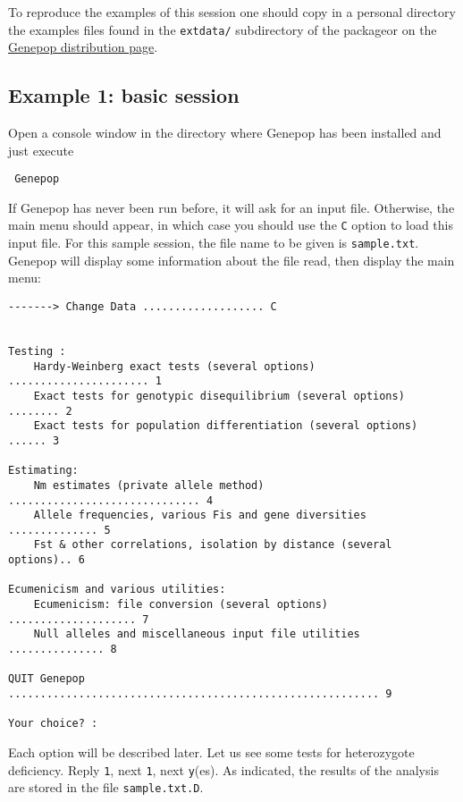 \documentclass[12pt,]{book}
\theoremstyle{definition}
\theoremstyle{definition}
\theoremstyle{definition}
\theoremstyle{remark}
\begin{document}
To reproduce the examples of this session one should copy in a personal
directory the examples files found in the \texttt{extdata/} subdirectory
of the packageor on the
\href{http://kimura.univ-montp2.fr/~rousset/Genepop.htm}{Genepop
distribution page}.

\subsection{Example 1: basic session}\label{example-1-basic-session}

Open a console window in the directory where Genepop has been installed
and just execute

\begin{verbatim}
 Genepop
\end{verbatim}

If Genepop has never been run before, it will ask for an input file.
Otherwise, the main menu should appear, in which case you should use the
\texttt{C} option to load this input file. For this sample session, the
file name to be given is \texttt{sample.txt}. Genepop will display some
information about the file read, then display the main menu:

\begin{verbatim}
-------> Change Data ................... C


Testing :
    Hardy-Weinberg exact tests (several options) ...................... 1
    Exact tests for genotypic disequilibrium (several options) ........ 2
    Exact tests for population differentiation (several options) ...... 3

Estimating:
    Nm estimates (private allele method) .............................. 4
    Allele frequencies, various Fis and gene diversities .............. 5
    Fst & other correlations, isolation by distance (several options).. 6

Ecumenicism and various utilities:
    Ecumenicism: file conversion (several options) .................... 7
    Null alleles and miscellaneous input file utilities ............... 8

QUIT Genepop .......................................................... 9

Your choice? :
\end{verbatim}

Each option will be described later. Let us see some tests for
heterozygote deficiency. Reply \texttt{1}, next \texttt{1}, next
\texttt{y}(es). As indicated, the results of the analysis are stored in
the file \texttt{sample.txt.D}.
\end{document}
